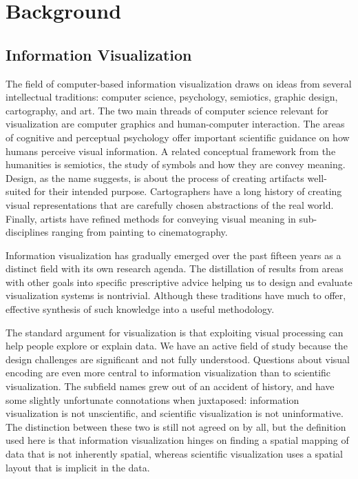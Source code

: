 \newpage
\section{Background}
\label{sec:background}


\subsection{Information Visualization}
\label{sec:infovis}

The field of computer-based information visualization draws on ideas from several intellectual traditions: computer science, psychology, semiotics, graphic design, cartography, and art.
The two main threads of computer science relevant for visualization are computer graphics and human-computer interaction.
The areas of cognitive and perceptual psychology offer important scientific guidance on how humans perceive visual information.
A related conceptual framework from the humanities is semiotics, the study of symbols and how they are convey meaning.
Design, as the name suggests, is about the process of creating artifacts well- suited for their intended purpose.
Cartographers have a long history of creating visual representations that are carefully chosen abstractions of the real world.
Finally, artists have refined methods for conveying visual meaning in sub-disciplines ranging from painting to cinematography.

Information visualization has gradually emerged over the past fifteen years as a distinct field with its own research agenda.
The distillation of results from areas with other goals into specific prescriptive advice helping us to design and evaluate visualization systems is nontrivial.
Although these traditions have much to offer, effective synthesis of such knowledge into a useful methodology.

The standard argument for visualization is that exploiting visual processing can help people explore or explain data. We have an active field of study because the design challenges are significant and not fully understood. Questions about visual encoding are even more central to information visualization than to scientific visualization.
The subfield names grew out of an accident of history, and have some slightly unfortunate connotations when juxtaposed:
information visualization is not unscientific, and scientific visualization is not uninformative.
The distinction between these two is still not agreed on by all, but the definition used here is that information visualization hinges on finding a spatial mapping of data that is not inherently spatial,
whereas scientific visualization uses a spatial layout that is implicit in the data.

